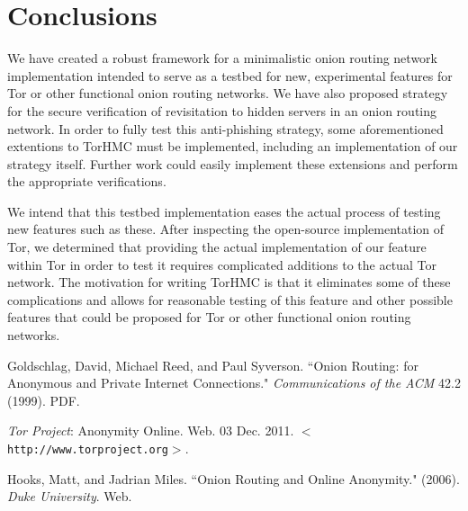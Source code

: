 \documentclass[12pt]{article}
\begin{document}
\section{Conclusions}
We have created a robust framework for a minimalistic onion routing network implementation intended to serve as a testbed for new, experimental features for Tor or other functional onion routing networks. We have also proposed strategy for the secure verification of revisitation to hidden servers in an onion routing network. In order to fully test this anti-phishing strategy, some aforementioned extentions to TorHMC must be implemented, including an implementation of our strategy itself. Further work could easily implement these extensions and perform the appropriate verifications.

We intend that this testbed implementation eases the actual process of testing new features such as these. After inspecting the open-source implementation of Tor, we determined that providing the actual implementation of our feature within Tor in order to test it requires complicated additions to the actual Tor network. The motivation for writing TorHMC is that it eliminates some of these complications and allows for reasonable testing of this feature and other possible features that could be proposed for Tor or other functional onion routing networks.



\begin{thebibliography}{1}

   Goldschlag, David, Michael Reed, and Paul Syverson. ``Onion Routing: for Anonymous and Private Internet Connections." {\it Communications of the ACM} 42.2 (1999). PDF.
  
   {\it Tor Project}: Anonymity Online. Web. 03 Dec. 2011. $<${\tt http://www.torproject.org}$>$.

    Hooks, Matt, and Jadrian Miles. ``Onion Routing and Online Anonymity." (2006). {\it Duke University}. Web.

  \end{thebibliography}
\end{document}
